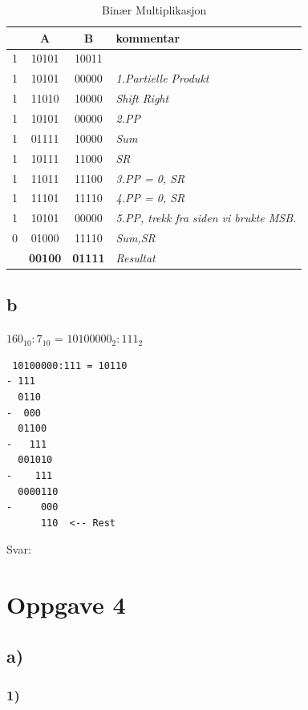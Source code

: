 \documentclass[12pt,norsk,a4paper]{article}
\begin{document}
\begin{table}[H]
\begin{center}
    \begin{tabular}{ r|c|c | l }
    \hline 
     & A & B & kommentar\\
    \hline
    1 & 10101 & 10011 &  \\ 
    \hline
    1 & 10101 & 00000 & \textit{1.Partielle Produkt}\\ 
    1 & 11010 & 10000 & \textit{Shift Right}\\
    1 & 10101 & 00000 & \textit{2.PP}\\
    \hline
    1 & 01111 & 10000 & \textit{Sum}\\
    1 & 10111 & 11000 & \textit{SR}\\
    1 & 11011 & 11100 & \textit{3.PP = 0, SR}\\
    1 & 11101 & 11110 & \textit{4.PP = 0, SR}\\
    1 & 10101 & 00000 & \textit{5.PP, trekk fra siden vi brukte MSB.}\\
    \hline
    0 & 01000 & 11110 & \textit{Sum,SR}\\
      & \textbf{00100} & \textbf{01111} & \textit{Resultat}\\
      \hline \hline
    \end{tabular}
    \end{center}
    \caption{Binær Multiplikasjon}
\end{table}


\subsection{b}

$160_{10}:7_{10}$ = $10100000_{2} : 111_{2}$

\begin{verbatim}
 10100000:111 = 10110
- 111
  0110
-  000
  01100
-   111
  001010
-    111
  0000110
-     000
      110  <-- Rest   
\end{verbatim}

Svar: 

\clearpage
\section{Oppgave 4}
\subsection{a)}
\subsubsection{1)}
\end{document}
